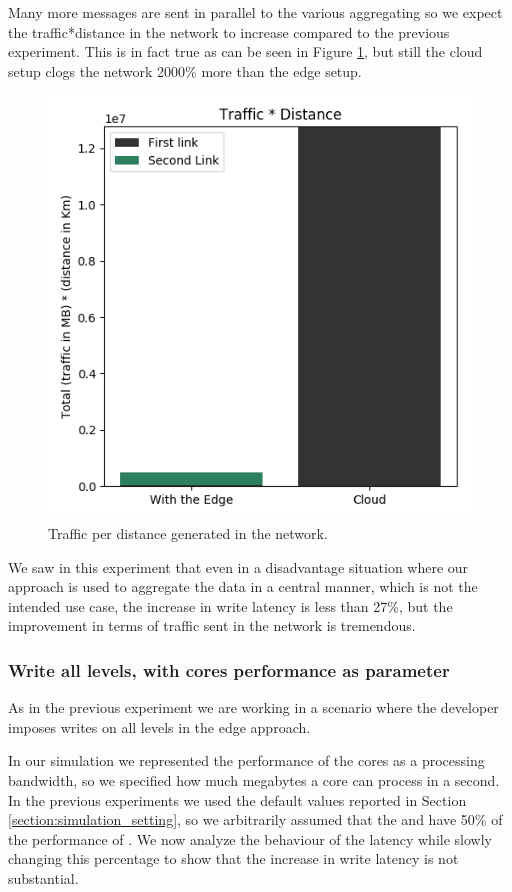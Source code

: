 Many more messages are sent in parallel to the various aggregating  so we expect the traffic*distance in the network to increase compared to the previous experiment. This is in fact true as can be seen in Figure \ref{fig:write-all-traffic1}, but still the cloud setup clogs the network 2000\% more than the edge setup.

\begin{figure}[H]
    \centering
    \includegraphics[width=0.75\linewidth]{Figures/Evaluation/write-all-traffic1.png}
    \caption{Traffic per distance generated in the network.}
    \label{fig:write-all-traffic1}
\end{figure}

We saw in this experiment that even in a disadvantage situation where our approach is used to aggregate the data in a central manner, which is not the intended use case, the increase in write latency is less than 27\%, but the improvement in terms of traffic sent in the network is tremendous.


\subsubsection{Write all levels, with cores performance as parameter}
As in the previous experiment we are working in a scenario where the developer imposes writes on all levels in the edge approach.

In our simulation we represented the performance of the cores as a processing bandwidth, so we specified how much megabytes a core can process in a second. In the previous experiments we used the default values reported in Section \ref{section:simulation_setting}, so we arbitrarily assumed that the  and  have 50\% of the performance of . We now analyze the behaviour of the latency while slowly changing this percentage to show that the increase in write latency is not substantial.

